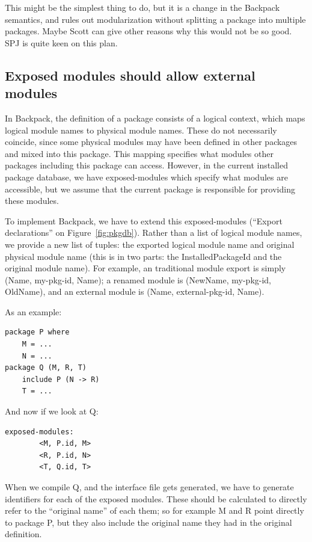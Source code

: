 \documentclass{article}
\begin{document}
This might be the simplest thing to do, but it is a change in the
Backpack semantics, and rules out modularization without splitting a package
into multiple packages.  Maybe Scott can give other reasons why this
would not be so good.  SPJ is quite keen on this plan.

\subsection{Exposed modules should allow external modules}\label{sec:reexport}

In Backpack, the definition of a package consists of a logical context,
which maps logical module names to physical module names.  These do not
necessarily coincide, since some physical modules may have been defined
in other packages and mixed into this package.  This mapping specifies
what modules other packages including this package can access.
However, in the current installed package database, we have exposed-modules which
specify what modules are accessible, but we assume that the current
package is responsible for providing these modules.

To implement Backpack, we have to extend this exposed-modules (``Export declarations''
on Figure~\ref{fig:pkgdb}).  Rather
than a list of logical module names, we provide a new list of tuples:
the exported logical module name and original physical module name (this
is in two parts: the InstalledPackageId and the original module name).
For example, an traditional module export is simply (Name, my-pkg-id, Name);
a renamed module is (NewName, my-pkg-id, OldName), and an external module
is (Name, external-pkg-id, Name).

As an example:

\begin{verbatim}
package P where
    M = ...
    N = ...
package Q (M, R, T)
    include P (N -> R)
    T = ...
\end{verbatim}

And now if we look at Q\@:

\begin{verbatim}
exposed-modules:
        <M, P.id, M>
        <R, P.id, N>
        <T, Q.id, T>
\end{verbatim}

When we compile Q, and the interface file gets generated, we have
to generate identifiers for each of the exposed modules.  These should
be calculated to directly refer to the ``original name'' of each them;
so for example M and R point directly to package P, but they also
include the original name they had in the original definition.
\end{document}
